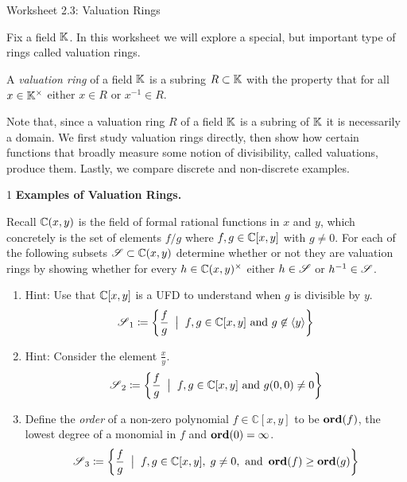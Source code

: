 \documentclass[Notebook.tex]{subfiles}
\begin{document}
\ifSubfilesClassLoaded{}{}


\begin{center}
    {Worksheet 2.3: Valuation Rings}
\end{center}

    Fix a field $\mathbb K$. In this worksheet we will explore a special, but important type of rings called valuation rings. 
    \begin{definition}
        A \emph{valuation ring} of a field $\mathbb K$ is a subring $R \subset \mathbb K$ with the property that for all $x \in \mathbb K^{\times}$ either $x \in R$ or $x^{-1} \in R$. 
    \end{definition}

    Note that, since a valuation ring $R$ of a field $\mathbb K$ is a subring of $\mathbb K$ it is necessarily a domain. We first study valuation rings directly, then show how certain functions that broadly measure some notion of divisibility, called valuations, produce them. Lastly, we compare discrete and non-discrete examples.


    \hrulefill 

    \begin{problem}{1}
        \textbf{Examples of Valuation Rings.} 
        
        Recall $\mathbb C(x,y)$ is the field of formal rational functions in $x$ and $y$, which concretely is the set of elements $f/g$ where $f,g\in \mathbb C[x,y]$ with $g\neq 0$.  For each of the following subsets $\operatorname{\mathscr S} \subset \mathbb C(x,y)$ determine whether or not they are valuation rings by showing whether for every $h \in \mathbb C(x,y)^{\times}$ either $h \in \operatorname{\mathscr S}$ or $h^{-1} \in \operatorname{\mathscr S}$.
        \begin{enumerate}[label=(\alph*),ref=\theenumi\alph*]
            \item Hint: Use that $\mathbb C[x,y]$ is a UFD to understand when $g$ is divisible by $y$.
            \[
            \operatorname{\mathscr S}_{1} \coloneqq \left\{ \frac{f}{g} \;\; \big| \;\; f,g \in \mathbb C[x,y] \text{ and } g\not \in \langle y \rangle \right\}
            \]


            \item Hint: Consider the element $\frac{x}{y}$. 
            \[
            \operatorname{\mathscr S}_{2} \coloneqq \left\{ \frac{f}{g} \;\; \big| \;\; f,g \in \mathbb C[x,y] \text{ and } g(0,0) \neq 0 \right\}
            \]

            \item Define the \emph{order} of a non-zero polynomial $f \in \mathbb{C}[x,y]$ to be $\operatorname{\textbf{ord}}(f)$, the lowest degree of a monomial in $f$ and $\operatorname{\textbf{ord}}(0)=\infty$. 
            \[
            \operatorname{\mathscr S}_{3} \coloneqq \left\{ \frac{f}{g} \;\; \big| \;\; f,g \in \mathbb C[x,y], \; g\neq0, \text{ and } \operatorname{\textbf{ord}}(f) \geq \operatorname{\textbf{ord}}(g) \right\}
            \]
        \end{enumerate}
    \end{problem}
\end{document}
